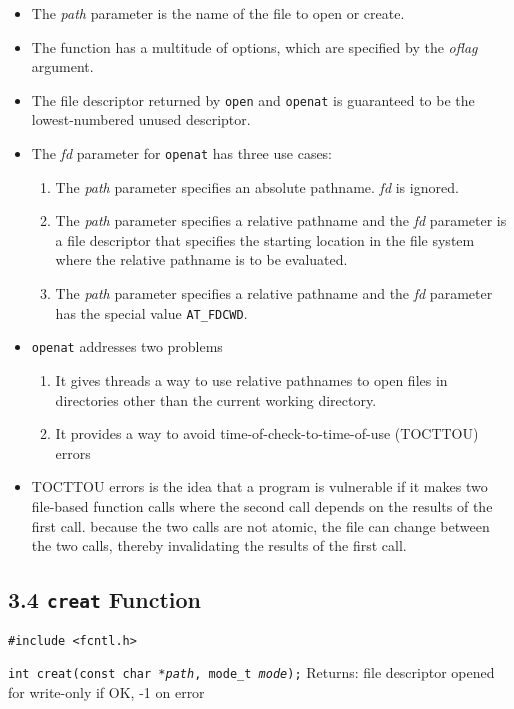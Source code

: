 \documentclass[]{article}
\newcommand{\code}{\texttt}
\begin{document}
\begin{itemize}
\item The \emph{path} parameter is the name of the file to open or create.
\item The function has a multitude of options, which are specified by the
\emph{oflag} argument.
\item The file descriptor returned by \code{open} and \code{openat} is
guaranteed to be the lowest-numbered unused descriptor.
\item The \emph{fd} parameter for \code{openat} has three use cases:
\begin{enumerate}
\item The \emph{path} parameter specifies an absolute pathname. \emph{fd} is
ignored.
\item The \emph{path} parameter specifies a relative pathname and the \emph{fd}
parameter is a file descriptor that specifies the starting location in the file
system where the relative pathname is to be evaluated.
\item The \emph{path} parameter specifies a relative pathname and the \emph{fd}
parameter has the special value \code{AT\_FDCWD}.
\end{enumerate}
\item \code{openat} addresses two problems
\begin{enumerate}
\item It gives threads a way to use relative pathnames to open files in
directories other than the current working directory.
\item It provides a way to avoid time-of-check-to-time-of-use (TOCTTOU) errors
\end{enumerate}
\item TOCTTOU errors is the idea that a program is vulnerable if it makes two
file-based function calls where the second call depends on the results of the
first call. because the two calls are not atomic, the file can change between
the two calls, thereby invalidating the results of the first call.
\end{itemize}

\subsection*{3.4 \code{creat} Function}
\code{\#include <fcntl.h>}

\code{int creat(const char *\emph{path}, mode\_t \emph{mode});}
Returns: file descriptor opened for write-only if OK, -1 on error
\end{document}
